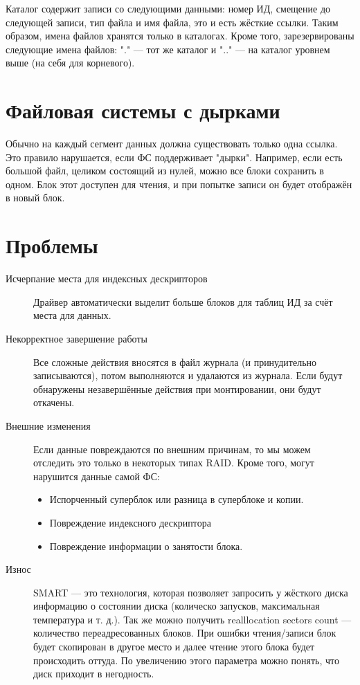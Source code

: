 \documentclass[main]{subfiles}
\begin{document}
Каталог содержит записи со следующими данными: номер ИД, смещение до следующей
записи, тип файла и имя файла, это и есть жёсткие ссылки.
Таким образом, имена файлов хранятся только в
каталогах. Кроме того, зарезервированы следующие имена файлов: "." --- тот же
каталог и ".." --- на каталог уровнем выше (на себя для корневого).

\section{Файловая системы с дырками}
Обычно на каждый сегмент данных должна существовать только одна ссылка.
Это правило нарушается, если ФС поддерживает "дырки". Например, если
есть большой файл, целиком состоящий из нулей, можно все блоки сохранить
в одном. Блок этот доступен для чтения, и при попытке записи он
будет отображён в новый блок.

\section{Проблемы}
\begin{description}
\item[Исчерпание места для индексных дескрипторов] Драйвер автоматически
выделит больше блоков для таблиц ИД за счёт места для данных.
\item[Некорректное завершение работы] Все сложные действия вносятся в
файл журнала (и принудительно записываются), потом выполняются и удалаются
из журнала. Если будут обнаружены незавершённые действия при монтировании,
они будут откачены.
\item[Внешние изменения] Если данные повреждаются по внешним причинам,
то мы можем отследить это только в некоторых типах RAID.
Кроме того, могут нарушится данные самой ФС:
\begin{itemize}
\item Испорченный суперблок или разница в суперблоке и копии.
\item Повреждение индексного дескриптора
\item Повреждение информации о занятости блока.
\end{itemize}
\item[Износ] SMART --- это технология, которая позволяет запросить у жёсткого диска
информацию о состоянии диска (колическо запусков, максимальная температура и
т. д.). Так же можно получить realllocation sectors count --- количество
переадресованных блоков. При ошибки чтения/записи блок будет скопирован
в другое место и далее чтение этого блока будет происходить оттуда.
По увеличению этого параметра можно понять, что диск приходит в негодность.
\end{description}
\end{document}
